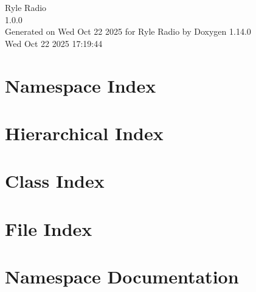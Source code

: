 \documentclass[twoside]{book}
\newcommand{\+}{\discretionary{\mbox{\scriptsize$\hookleftarrow$}}{}{}}
\newcommand{\clearemptydoublepage}{%
    \newpage{\pagestyle{empty}\cleardoublepage}%
  }
\begin{document}
  \raggedbottom
    \hypersetup{pageanchor=false,
                bookmarksnumbered=true,
                pdfencoding=unicode
               }
  \begin{titlepage}
  \vspace*{7cm}
  \begin{center}%
  {\Large Ryle Radio}\\
  [1ex]\large 1.\+0.\+0 \\
  \vspace*{1cm}
  {\large Generated on Wed Oct 22 2025 for Ryle Radio by Doxygen 1.14.0}\\
    \vspace*{0.5cm}
    {\small Wed Oct 22 2025 17:19:44}
  \end{center}
  \end{titlepage}
  \clearemptydoublepage
  \tableofcontents
  \clearemptydoublepage
  \hypersetup{pageanchor=true}
\chapter{Namespace Index}

\chapter{Hierarchical Index}

\chapter{Class Index}

\chapter{File Index}

\chapter{Namespace Documentation}





\end{document}

